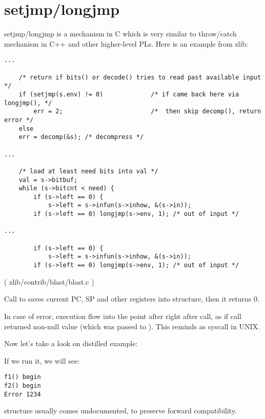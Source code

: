 \section{setjmp/longjmp}


setjmp/longjmp is a mechanism in C which is very similar to throw/catch mechanism in C++ and other higher-level \ac{PL}s.
Here is an example from zlib:

\begin{lstlisting}[style=customc]
...

    /* return if bits() or decode() tries to read past available input */
    if (setjmp(s.env) != 0)             /* if came back here via longjmp(), */
        err = 2;                        /*  then skip decomp(), return error */
    else
	err = decomp(&s); /* decompress */

...

    /* load at least need bits into val */
    val = s->bitbuf;
    while (s->bitcnt < need) {
        if (s->left == 0) {
            s->left = s->infun(s->inhow, &(s->in));
	    if (s->left == 0) longjmp(s->env, 1); /* out of input */

...

        if (s->left == 0) {
            s->left = s->infun(s->inhow, &(s->in));
	    if (s->left == 0) longjmp(s->env, 1); /* out of input */
\end{lstlisting}
( zlib/contrib/blast/blast.c )

Call to  saves current \ac{PC}, \ac{SP} and other registers into  structure, then it returns 0.

In case of error,   execution flow into the point after right after  call,
as if  call returned non-null value (which was passed to ).
This reminds as  syscall in UNIX.

Now let's take a look on distilled example:



If we run it, we will see:

\begin{lstlisting}
f1() begin
f2() begin
Error 1234
\end{lstlisting}

 structure usually comes undocumented, to preserve forward compatibility.


